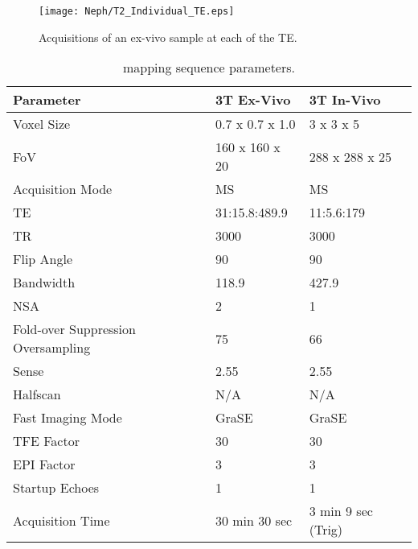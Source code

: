 \begin{figure}[H]
	\centering
	\texttt{[image: Neph/T2\_Individual\_TE.eps]}
	\caption{Acquisitions of an ex-vivo sample at each of the \ac{TE}.}
	\label{fig:ex_t2_raw_data}	
\end{figure}

\begin{table}[H]
	\centering
	\begin{tabularx}{1.0\textwidth}{|X|X|X|}
		\hline
		Parameter                          & 3T Ex-Vivo      & 3T In-Vivo         \\ \hline
		Voxel Size                         & 0.7 x 0.7 x 1.0 & 3 x 3 x 5          \\ \hline
		FoV                                & 160 x 160 x 20  & 288 x 288 x 25     \\ \hline
		Acquisition Mode                   & MS              & MS                 \\ \hline
		TE                                 & 31:15.8:489.9   & 11:5.6:179         \\ \hline
		TR                                 & 3000            & 3000               \\ \hline
		Flip Angle                         & 90              & 90                 \\ \hline
		Bandwidth                          & 118.9           & 427.9              \\ \hline
		NSA                                & 2               & 1                  \\ \hline
		Fold-over Suppression Oversampling & 75              & 66                 \\ \hline
		Sense                              & 2.55            & 2.55               \\ \hline
		Halfscan                           & N/A             & N/A                \\ \hline
		Fast Imaging Mode                  & GraSE           & GraSE              \\ \hline
		TFE Factor                         & 30              & 30                 \\ \hline
		EPI Factor                         & 3               & 3                  \\ \hline
		Startup Echoes                     & 1               & 1                  \\ \hline
		Acquisition Time                   & 30 min 30 sec   & 3 min 9 sec (Trig) \\ \hline
	\end{tabularx}
	\caption{\ttwo mapping sequence parameters.}
	\label{tab:ex_t2_mapping}
\end{table}

